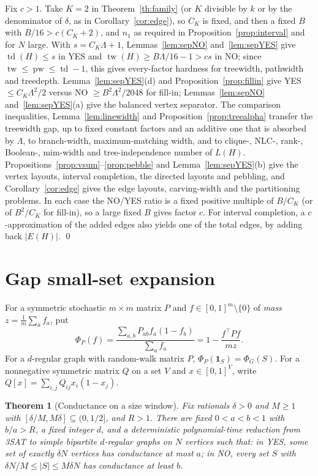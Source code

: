 \documentclass[11pt,letterpaper]{article}
\newtheorem{theorem}{Theorem}[section]
\theoremstyle{definition}
\theoremstyle{remark}
\newcommand{\ind}{\mathbf 1}
\DeclareMathOperator{\tw}{tw}
\DeclareMathOperator{\pw}{pw}
\DeclareMathOperator{\td}{td}
\begin{document}
Fix \(c>1\). Take \(K=2\) in Theorem~\ref{th:family} (or \(K\) divisible by
\(k\) or by the denominator of \(\delta\), as in Corollary~\ref{cor:edge}),
so \(C_K\) is fixed, and then a fixed \(B\) with \(B/16>c(C_K+2)\), and
\(n_1\) as required in Proposition~\ref{prop:interval} and for \(N\) large.
With \(s=C_K\Lambda+1\), Lemmas~\ref{lem:sepNO} and~\ref{lem:sepYES} give
\(\td(H)\le s\) in YES and \(\tw(H)\ge B\Lambda/16-1>cs\) in NO; since
\(\tw\le\pw\le\td-1\), this gives every-factor hardness for treewidth,
pathwidth and treedepth. Lemma~\ref{lem:sepYES}(d) and
Proposition~\ref{prop:fillin} give YES \(\le C_K\Lambda^2/2\) versus NO
\(\ge B^2\Lambda^2/2048\) for fill-in; Lemmas~\ref{lem:sepNO}
and~\ref{lem:sepYES}(a) give the balanced vertex separator. The comparison
inequalities, Lemma~\ref{lem:linewidth} and
Proposition~\ref{prop:treealpha} transfer the treewidth gap, up to fixed
constant factors and an additive one that is absorbed by \(\Lambda\), to
branch-width, maximum-matching width, and to clique-, NLC-, rank-,
Boolean-, mim-width and tree-independence number of \(L(H)\).
Propositions~\ref{prop:vsum}--\ref{prop:pebble} and Lemma~\ref{lem:sepYES}(b)
give the vertex layouts, interval completion, the directed layouts and
pebbling, and Corollary~\ref{cor:edge} gives the edge layouts, carving-width
and the partitioning problems. In each case the NO/YES ratio is a fixed
positive multiple of \(B/C_K\) (or of \(B^2/C_K\) for fill-in), so a large
fixed \(B\) gives factor \(c\). For interval completion, a
\(c\)-approximation of the added edges also yields one of the total edges,
by adding back \(|E(H)|\). \qed

\section{Gap small-set expansion}\label{sec:sse}

For a symmetric stochastic \(m\times m\) matrix \(P\) and
\(f\in[0,1]^m\setminus\{0\}\) of \emph{mass} \(z=\frac1m\sum_af_a\), put
\[
\Phi_P(f)=\frac{\sum_{a,b}P_{ab}f_a(1-f_b)}{\sum_af_a}=1-\frac{f^{\top}Pf}{mz}.
\]
For a \(d\)-regular graph with random-walk matrix \(P\), \(\Phi_P(\ind_S)=
\Phi_G(S)\). For a nonnegative symmetric matrix \(Q\) on a set \(V\) and
\(x\in[0,1]^V\), write \(Q[x]=\sum_{i,j}Q_{ij}x_i(1-x_j)\).

\begin{theorem}[Conductance on a size window]\label{th:window}
Fix rationals \(\delta>0\) and \(M\ge1\) with \([\delta/M,M\delta]\subseteq
(0,1/2]\), and \(R>1\). There are fixed \(0<a<b<1\) with \(b/a>R\), a fixed
integer \(d\), and a deterministic polynomial-time reduction from 3SAT to
simple bipartite \(d\)-regular graphs on \(N\) vertices such that: in YES,
some set of exactly \(\delta N\) vertices has conductance at most \(a\); in
NO, every set \(S\) with \(\delta N/M\le|S|\le M\delta N\) has conductance at
least \(b\).
\end{theorem}
\end{document}
